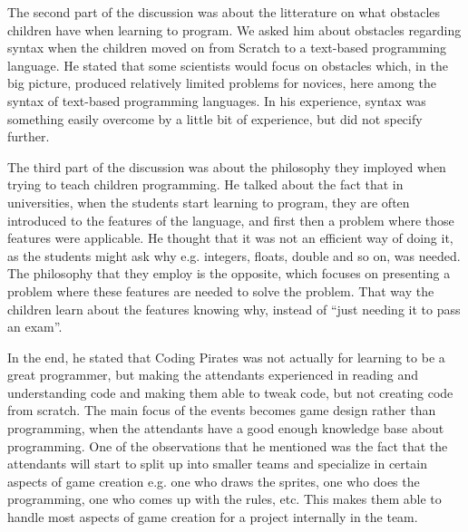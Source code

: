 The second part of the discussion was about the litterature on what obstacles children have when learning to program. We asked him about obstacles regarding syntax when the children moved on from Scratch to a text-based programming language. He stated that some scientists would focus on obstacles which, in the big picture, produced relatively limited problems for novices, here among the syntax of text-based programming languages. In his experience, syntax was something easily overcome by a little bit of experience, but did not specify further.

The third part of the discussion was about the philosophy they imployed when trying to teach children programming. He talked about the fact that in universities, when the students start learning to program, they are often introduced to the features of the language, and first then a problem where those features were applicable. He thought that it was not an efficient way of doing it, as the students might ask why e.g. integers, floats, double and so on, was needed. The philosophy that they employ is the opposite, which focuses on presenting a problem where these features are needed to solve the problem. That way the children learn about the features knowing why, instead of ``just needing it to pass an exam''.

In the end, he stated that Coding Pirates was not actually for learning to be a great programmer, but making the attendants experienced in reading and understanding code and making them able to tweak code, but not creating code from scratch. The main focus of the events becomes game design rather than programming, when the attendants have a good enough knowledge base about programming. One of the observations that he mentioned was the fact that the attendants will start to split up into smaller teams and specialize in certain aspects of game creation e.g. one who draws the sprites, one who does the programming, one who comes up with the rules, etc. This makes them able to handle most aspects of game creation for a project internally in the team.